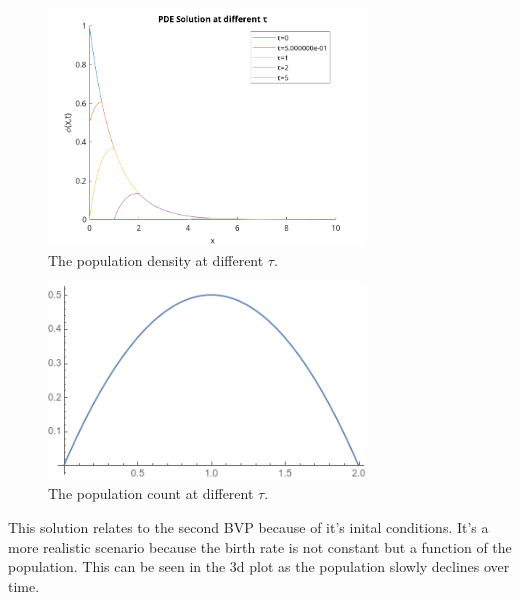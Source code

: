\documentclass[paper=a4, fontsize=11pt]{scrartcl} %
\numberwithin{equation}{section} %
\numberwithin{figure}{section} %
\numberwithin{table}{section} %
\begin{document}
\begin{figure}[H]\label{prob2:tau}
	\centering
	\includegraphics[width=0.75\textwidth]{prob4}
	\caption{The population density at different $\tau$.}
\end{figure}
\begin{figure}[H]\label{prob2:tau}
	\centering
	\includegraphics[width=0.75\textwidth]{prob4-pop}
	\caption{The population count at different $\tau$.}
\end{figure}

This solution relates to the second BVP because of it's inital conditions. It's a more realistic scenario because the birth rate is not constant but a function of the population. This can be seen in the 3d plot as the population slowly declines over time.
\end{document}
